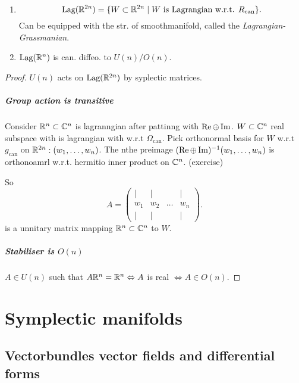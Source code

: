 \begin{proposition}
	\begin{enumerate}
		\item 
	\[
		\text{Lag}(\mathbb{R}^{2n}) = \{W \subset  \mathbb{R}^{2n} \;|\; W \text{ is Lagrangian w.r.t. $R_\text{can}$}\} 
	.\] 
	Can be equipped with the str. of smoothmanifold, called the \emph{Lagrangian-Grassmanian}. 
\item $\text{Lag}(\mathbb{R}^{n})$ is can. diffeo. to $U(n) / O(n)$. 
	\end{enumerate}
\end{proposition}
\begin{proof}
	$U(n)$ acts on $\text{Lag}(\mathbb{R}^{2n})$ by syplectic matrices. 
	\paragraph{Group action is transitive}
	Consider $\mathbb{R}^{n}\subset \mathbb{C}^{n}$ is lagranngian after pattinng with $\operatorname{Re} \oplus \operatorname{Im}$.
	$W \subset  \mathbb{C}^{n}$ real subspace with is lagrangian with w.r.t $\Omega_\text{can} $. 
	Pick orthonormal basis for $W$ w.r.t $g_\text{can} $ on $\mathbb{R}^{2n}: (w_1, \ldots, w_n)$.
	The nthe preimage $(\operatorname{Re} \oplus \operatorname{Im})^{-1}(w_1, \ldots, w_n)$ is orthonoamrl w.r.t. hermitio inner product on $\mathbb{C}^{n}$. (exercise)

	So \[
		A = \begin{pmatrix} | & | & & | \\ 
		w_1 & w_2 & \ldots & w_n \\
	| & |& & | \end{pmatrix} 
	.\] 
	is a unnitary matrix mapping $\mathbb{R}^{n} \subset \mathbb{C}^{n}$ to $W$. 
	\paragraph{Stabiliser is $O(n)$}
	$A \in U(n)$ such that $A \mathbb{R}^{n } = \mathbb{R}^{n} \Leftrightarrow A$ is real $ \iff A \in O(n)$. 
\end{proof}

\chapter{Symplectic manifolds} \label{chap:symplectic_manifolds}

\section{Vectorbundles vector fields and differential forms} \label{sec:vectorbundles_vector_fields_and_differential_forms}

